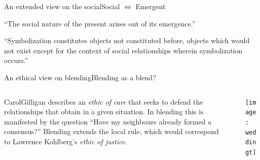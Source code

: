 \begin{frame}{An extended view on the social}{Social $\Leftrightarrow$ Emergent}
{\small ``The social nature of the present arises out of its emergence.''

\medskip



``Symbolization constitutes objects not constituted before, objects which would not exist except for the context of social relationships wherein symbolization occurs.''
} \qquad\qquad {}
\end{frame}

\begin{frame}{An ethical view on blending}{Blending as a blend?}
\begin{columns}[onlytextwidth]
\begin{column}[T]{3in}
{Carol\bsp Gilligan} describes an
\emph{ethic of care} that seeks to defend the
relationships that obtain in a given situation.  In blending this is
manifested by the question ``Have my neighbours already formed a
consensus?''  Blending extends the local rule, which would correspond
to Lawrence Kohlberg's \emph{ethic of justice}.
\end{column}
\begin{column}[T]{.1in}
\end{column}
\begin{column}[T]{2in}
\vspace*{.2in}
\texttt{[image: weddingt]}
\end{column}
\end{columns}
\end{frame}

